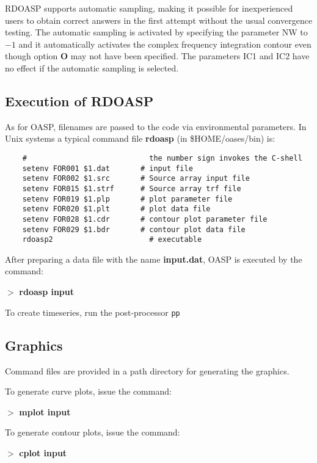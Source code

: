


    RDOASP supports   
automatic  sampling,  making  it possible for inexperienced users  to  obtain 
correct   answers  in  the  first  attempt  without   the   usual 
convergence  testing.  The  automatic sampling  is  activated  by 
specifying the parameter NW to $ -1$ and it automatically  activates 
the  complex frequency integration contour even though option  {\bf O} 
may  not have been specified. The parameters IC1 and IC2 have  no 
effect if the automatic sampling is selected.
 
\subsection{Execution of RDOASP}

    As  for  OASP,  filenames  are  passed  to  the  code   via 
environmental parameters. In Unix systems a typical command  file 
{\bf rdoasp} (in  \$HOME/oases/bin) is:

\small
\begin{verbatim}
    #                            the number sign invokes the C-shell 
    setenv FOR001 $1.dat       # input file 
    setenv FOR002 $1.src       # Source array input file
    setenv FOR015 $1.strf      # Source array trf file
    setenv FOR019 $1.plp       # plot parameter file
    setenv FOR020 $1.plt       # plot data file  
    setenv FOR028 $1.cdr       # contour plot parameter file 
    setenv FOR029 $1.bdr       # contour plot data file 
    rdoasp2                      # executable
\end{verbatim}
\normalsize

    After preparing a data file with the name {\bf input.dat}, OASP  is 
executed by the command:

    $>$ {\bf rdoasp input}

To create timeseries, run the post-processor \tt pp \rm

\subsection{Graphics}  

    Command files are provided in a path directory for generating 
the graphics.

\noindent    To generate curve plots, issue the command:

    $>$ {\bf mplot input}

\noindent    To generate contour plots, issue the command:

    $>$ {\bf cplot input}


